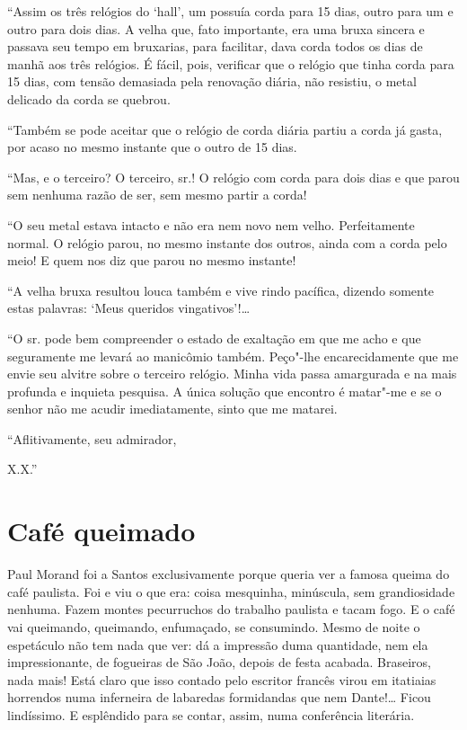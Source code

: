 ``Assim os três relógios do `hall', um possuía corda para 15 dias, outro
para um e outro para dois dias. A velha que, fato importante, era uma
bruxa sincera e passava seu tempo em bruxarias, para facilitar, dava
corda todos os dias de manhã aos três relógios. É fácil, pois, verificar
que o relógio que tinha corda para 15 dias, com tensão demasiada pela
renovação diária, não resistiu, o metal delicado da corda se quebrou.

``Também se pode aceitar que o relógio de corda diária partiu a corda já
gasta, por acaso no mesmo instante que o outro de 15 dias.

``Mas, e o terceiro? O terceiro, sr.! O relógio com corda para dois dias
e que parou sem nenhuma razão de ser, sem mesmo partir a corda!

``O seu metal estava intacto e não era nem novo nem velho. Perfeitamente
normal. O relógio parou, no mesmo instante dos outros, ainda com a corda
pelo meio! E quem nos diz que parou no mesmo instante!

``A velha bruxa resultou louca também e vive rindo pacífica, dizendo
somente estas palavras: `Meus queridos vingativos'!\ldots{}

``O sr. pode bem compreender o estado de exaltação em que me acho e que
seguramente me levará ao manicômio também. Peço"-lhe encarecidamente que
me envie seu alvitre sobre o terceiro relógio. Minha vida passa
amargurada e na mais profunda e inquieta pesquisa. A única solução que
encontro é matar"-me e se o senhor não me acudir imediatamente, sinto que
me matarei.

``Aflitivamente, seu admirador,

X.X.''

\chapter{Café queimado}

Paul Morand foi a Santos exclusivamente porque queria ver a famosa
queima do café paulista. Foi e viu o que era: coisa mesquinha,
minúscula, sem grandiosidade nenhuma. Fazem montes pecurruchos do
trabalho paulista e tacam fogo. E o café vai queimando, queimando,
enfumaçado, se consumindo. Mesmo de noite o espetáculo não tem nada que
ver: dá a impressão duma quantidade, nem ela impressionante, de
fogueiras de São João, depois de festa acabada. Braseiros, nada mais!
Está claro que isso contado pelo escritor francês virou em itatiaias
horrendos numa inferneira de labaredas formidandas que nem Dante!\ldots{}
Ficou lindíssimo. E esplêndido para se contar, assim, numa conferência
literária.

